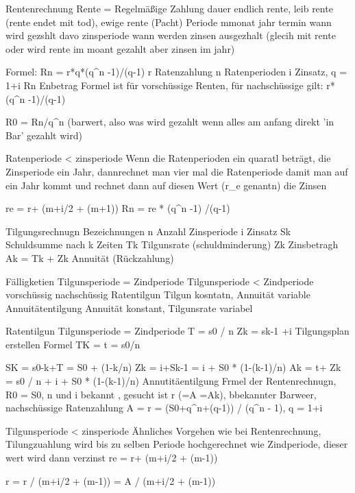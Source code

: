 \documentclass[a4paper]{scrartcl}
\begin{document}
        Rentenrechnung
        Rente = Regelmäßige Zahlung
        dauer endlich rente, leib rente (rente endet mit tod), ewige rente (Pacht)
        Periode mmonat jahr 
        termin wann wird gezshlt davo
        zinsperiode wann werden zinsen ausgezhalt (glecih mit rente oder wird rente im moant gezahlt aber zinsen im jahr)

        Formel: Rn = r*q*(q^n -1)/(q-1)
        r Ratenzahlung
        n Ratenperioden
        i Zinsatz, q = 1+i
        Rn Enbetrag
        Formel ist für vorschüssige Renten, für nachschüssige gilt:
        r*(q^n -1)/(q-1)

        R0 = Rn/q^n (barwert, also was wird gezahlt wenn alles am anfang direkt 'in Bar' gezahlt wird)

        Ratenperiode < zinsperiode
        Wenn die Ratenperioden ein quaratl beträgt, die Zinsperiode ein Jahr, dannrechnet man vier mal die Ratenperiode damit man auf ein Jahr kommt und rechnet dann auf diesen Wert (r_e genantn) 
        die Zinsen

        re = r+ (m+i/2 + (m+1))
        Rn = re * (q^n -1) /(q-1)


        Tilgungsrechnugn
        Bezeichnungen 
        n Anzahl Zinsperiode
        i Zinsatz
        Sk Schuldsumme nach k Zeiten
        Tk Tilgunsrate  (schuldminderung)
        Zk Zinsbetragh
        Ak = Tk + Zk Annuität (Rückzahlung)

        Fälligketien 
            Tilgunsperiode  = Zindperiode
            Tilgunsperiode  < Zindperiode
            vorschüssig nachschüssig
        Ratentilgun Tilgun kosntatn, Annuität variable
        Annuitätentilgung Annuität konstant, Tilgunsrate variabel

        Ratentilgun 
            Tilgunsperiode  = Zindperiode
            T = s0 / n
            Zk = sk-1 +i
            Tilgungsplan erstellen
            Formel TK = t = s0/n

            SK = s0-k+T = S0 + (1-k/n)
            Zk = i+Sk-1 = i + S0 * (1-(k-1)/n)
            Ak = t+ Zk = s0 / n + i + S0 * (1-(k-1)/n)
        Annutitäentilgung
            Frmel der Rentenrechnugn, R0 = S0, n und i bekannt , gesucht ist r (=A =Ak), bbekannter Barweer, nachschüssige Ratenzahlung
            A = r = (S0+q^n+(q-1)) / (q^n - 1), q = 1+i


        Tilgunsperiode < zinsperiode   
            Ähnliches Vorgehen wie bei Rentenrechnung, Tilungzuahlung wird bis zu selben Periode hochgerechnet wie Zindperiode, dieser wert wird dann verzinst
            re = r+ (m+i/2 + (m-1)) 

            r = r / (m+i/2 + (m-1)) = A / (m+i/2 + (m-1))
\end{document}
